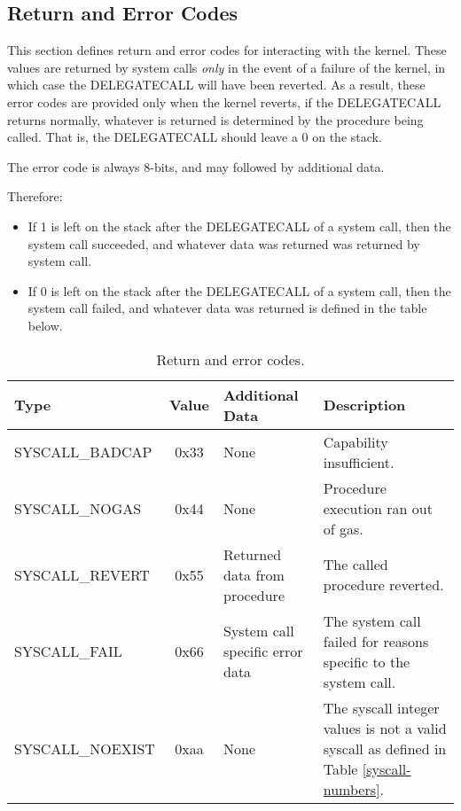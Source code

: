 \documentclass[english,a4paper]{article}
\begin{document}
\subsection{Return and Error Codes}\label{errors}
This section defines return and error codes for interacting with the kernel.
These values are returned by system calls \emph{only} in the event of a failure
of the kernel, in which case the DELEGATECALL will have been reverted. As a
result, these error codes are provided only when the kernel reverts, if the
DELEGATECALL returns normally, whatever is returned is determined by the
procedure being called. That is, the DELEGATECALL should leave a 0 on the stack.

The error code is always 8-bits, and may followed by additional data.

Therefore:

\begin{itemize}
  \item If 1 is left on the stack after the DELEGATECALL of a system call, then
  the system call succeeded, and whatever data was returned was returned by
  system call.
  \item If 0 is left on the stack after the DELEGATECALL of a system call, then
  the system call failed, and whatever data was returned is defined in the table
  below.
\end{itemize}

\begin{table}[H]
  \caption{Return and error codes.}
  \centering{}%
  \begin{tabularx}{\textwidth}{l|c|X|X}
    \hline
    Type & Value & Additional Data & Description \\
    \hline
    \hline
    SYSCALL\_BADCAP  & 0x33 & None & Capability insufficient. \\
    SYSCALL\_NOGAS   & 0x44 & None & Procedure execution ran out of gas. \\
    SYSCALL\_REVERT  & 0x55 & Returned data from procedure & The called
      procedure reverted. \\
    SYSCALL\_FAIL    & 0x66 & System call specific error data & The system call
      failed for reasons specific to the system call. \\
    SYSCALL\_NOEXIST & 0xaa & None & The syscall integer values is not a valid
      syscall as defined in Table \ref{syscall-numbers}. \\
    \hline
  \end{tabularx}
\end{table}
\end{document}
